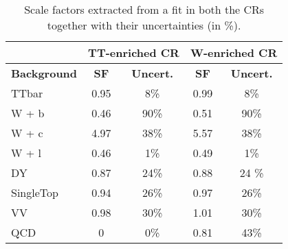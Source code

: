 \documentclass[10pt]{article}
\begin{document}
\begin{table}[!ht]
\begin{center}
\begin{tabular}{|l|c|c||c|c|}
\hline
\hline
& \multicolumn{2}{c|}{\textbf{TT-enriched CR }} & \multicolumn{2}{c|}{\textbf{W-enriched CR}} \\
\hline
\hline
\textbf{Background} & \textbf{SF} & \textbf{Uncert.} & \textbf{SF} & \textbf{Uncert.}\\
\hline
TTbar                       & 0.95 & 8\%    & 0.99 & 8\%  \\
\hline
W + b                       & 0.46 & 90\%   & 0.51 & 90\% \\
W + c                       & 4.97 & 38\%   & 5.57 & 38\% \\
W + l                       & 0.46 & 1\%    & 0.49 & 1\%  \\
\hline
DY                          & 0.87 & 24\%   & 0.88 & 24 \%\\
\hline
SingleTop                   & 0.94 & 26\%   & 0.97 & 26\% \\
\hline
VV                          & 0.98 & 30\%   & 1.01 & 30\% \\
\hline
QCD                         & 0    & 0\%    & 0.81 & 43\% \\
\hline
\hline
\end{tabular}
\caption{Scale factors extracted from a fit in both the CRs together with their uncertainties (in \%).}
\label{tab:SFtable}
\end{center}
\end{table} 
\end{document}
